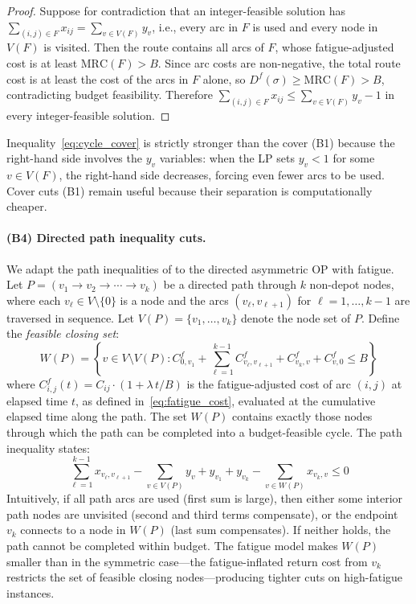 \documentclass[preprint,11pt]{elsarticle}
\begin{document}
\begin{proof}
Suppose for contradiction that an integer-feasible solution has $\sum_{(i,j) \in F} x_{ij} = \sum_{v \in V(F)} y_v$, i.e., every arc in $F$ is used and every node in $V(F)$ is visited.
Then the route contains all arcs of $F$, whose fatigue-adjusted cost is at least $\text{MRC}(F) > B$.
Since arc costs are non-negative, the total route cost is at least the cost of the arcs in $F$ alone, so $D^f(\sigma) \geq \text{MRC}(F) > B$, contradicting budget feasibility.
Therefore $\sum_{(i,j) \in F} x_{ij} \leq \sum_{v \in V(F)} y_v - 1$ in every integer-feasible solution.
\end{proof}

Inequality~\eqref{eq:cycle_cover} is strictly stronger than the cover (B1) because the right-hand side involves the $y_v$ variables: when the LP sets $y_v < 1$ for some $v \in V(F)$, the right-hand side decreases, forcing even fewer arcs to be used.
Cover cuts (B1) remain useful because their separation is computationally cheaper.

\paragraph{(B4) Directed path inequality cuts.}
We adapt the path inequalities of \citet{fischetti1998solving} to the directed asymmetric OP with fatigue.
Let $P = (v_1 \to v_2 \to \cdots \to v_k)$ be a directed path through $k$ non-depot nodes, where each $v_\ell \in V \setminus \{0\}$ is a node and the arcs $(v_\ell, v_{\ell+1})$ for $\ell = 1, \ldots, k-1$ are traversed in sequence.
Let $V(P) = \{v_1, \ldots, v_k\}$ denote the node set of $P$.
Define the \emph{feasible closing set}:
\begin{equation}
  W(P) = \left\{ v \in V \setminus V(P) : C_{0,v_1}^f + \sum_{\ell=1}^{k-1} C_{v_\ell, v_{\ell+1}}^f + C_{v_k, v}^f + C_{v, 0}^f \leq B \right\}
  \label{eq:wp}
\end{equation}
where $C_{i,j}^f(t) = C_{ij} \cdot (1 + \lambda\, t / B)$ is the fatigue-adjusted cost of arc $(i,j)$ at elapsed time $t$, as defined in~\eqref{eq:fatigue_cost}, evaluated at the cumulative elapsed time along the path.
The set $W(P)$ contains exactly those nodes through which the path can be completed into a budget-feasible cycle.
The path inequality states:
\begin{equation}
  \sum_{\ell=1}^{k-1} x_{v_\ell, v_{\ell+1}} - \sum_{v \in V(P)} y_v + y_{v_1} + y_{v_k} - \sum_{v \in W(P)} x_{v_k, v} \leq 0
  \label{eq:path_ineq}
\end{equation}
Intuitively, if all path arcs are used (first sum is large), then either some interior path nodes are unvisited (second and third terms compensate), or the endpoint $v_k$ connects to a node in $W(P)$ (last sum compensates).
If neither holds, the path cannot be completed within budget.
The fatigue model makes $W(P)$ smaller than in the symmetric case---the fatigue-inflated return cost from $v_k$ restricts the set of feasible closing nodes---producing tighter cuts on high-fatigue instances.
\end{document}
